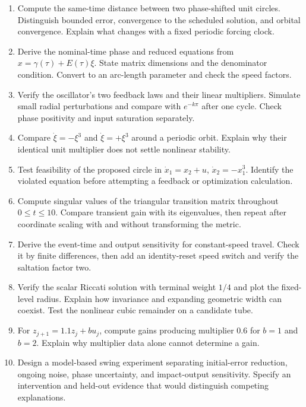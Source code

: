 \begin{enumerate}[itemsep=3pt,parsep=0pt]
\item Compute the same-time distance between two phase-shifted unit circles.
Distinguish bounded error, convergence to the scheduled solution, and orbital
convergence. Explain what changes with a fixed periodic forcing clock.
\item Derive the nominal-time phase and reduced equations from
$x=\gamma(\tau)+E(\tau)\xi$. State matrix dimensions and the denominator
condition. Convert to an arc-length parameter and check the speed factors.
\item Verify the oscillator's two feedback laws and their linear multipliers.
Simulate small radial perturbations and compare with $e^{-k\pi}$ after one
cycle. Check phase positivity and input saturation separately.
\item Compare $\dot\xi=-\xi^3$ and $\dot\xi=+\xi^3$ around a periodic orbit.
Explain why their identical unit multiplier does not settle nonlinear stability.
\item Test feasibility of the proposed circle in
$\dot x_1=x_2+u$, $\dot x_2=-x_1^3$. Identify the violated equation before
attempting a feedback or optimization calculation.
\item Compute singular values of the triangular transition matrix throughout
$0\leq t\leq10$. Compare transient gain with its eigenvalues, then repeat
after coordinate scaling with and without transforming the metric.
\item Derive the event-time and output sensitivity for constant-speed travel.
Check it by finite differences, then add an identity-reset speed switch and
verify the saltation factor two.
\item Verify the scalar Riccati solution with terminal weight $1/4$ and plot
the fixed-level radius. Explain how invariance and expanding geometric width
can coexist. Test the nonlinear cubic remainder on a candidate tube.
\item For $z_{j+1}=1.1z_j+b u_j$, compute gains producing multiplier $0.6$
for $b=1$ and $b=2$. Explain why multiplier data alone cannot determine a gain.
\item Design a model-based swing experiment separating initial-error reduction,
ongoing noise, phase uncertainty, and impact-output sensitivity. Specify an
intervention and held-out evidence that would distinguish competing explanations.
\end{enumerate}
